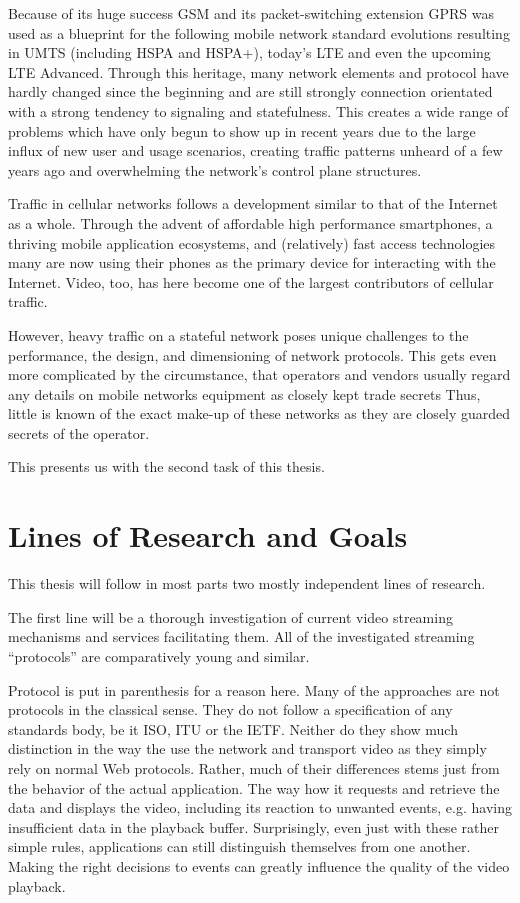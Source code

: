 Because of its huge success \gls{GSM} and its packet-switching extension \gls{GPRS} was used as a blueprint for the following mobile network standard evolutions resulting in \gls{UMTS} (including \gls{HSPA} and \gls{HSPA+}), today's \gls{LTE} and even the upcoming \gls{LTE} Advanced. Through this heritage, many network elements and protocol have hardly changed since the beginning and are still strongly connection orientated with a strong tendency to signaling and statefulness.
This creates a wide range of problems which have only begun to show up in recent years due to the large influx of new user and usage scenarios, creating traffic patterns unheard of a few years ago and overwhelming the network's control plane structures. 

Traffic in cellular networks follows a development similar to that of the Internet as a whole. Through the advent of affordable high performance smartphones, a thriving mobile application ecosystems, and (relatively) fast access technologies many are now using their phones as the primary device for interacting with the Internet. Video, too, has here become one of the largest contributors of cellular traffic. 

However, heavy traffic on a stateful network poses unique challenges to the performance, the design, and dimensioning of network protocols. This gets even more complicated by the circumstance, that operators and vendors usually regard any details on mobile networks equipment as closely kept trade secrets Thus, little is known of the exact make-up of these networks as they are closely guarded secrets of the operator.

This presents us with the second task of this thesis.



\section{Lines of Research and Goals}

This thesis will follow in most parts two mostly independent lines of research.

The first line will be a thorough investigation of current video streaming mechanisms and services facilitating them. All of the investigated streaming ``protocols'' are comparatively young and similar. 

Protocol is put in parenthesis for a reason here. Many of the approaches are not protocols in the classical sense. They do not follow a specification of any standards body, be it \gls{ISO}, \gls{ITU} or the \gls{IETF}. Neither do they show much distinction in the way the use the network and transport video as they simply rely on normal Web protocols. Rather, much of their differences stems just from the behavior of the actual application. The way how it requests and retrieve the data and displays the video, including its reaction to unwanted events, e.g. having insufficient data in the playback buffer. 
Surprisingly, even just with these rather simple rules, applications can still distinguish themselves from one another. Making the right decisions to events can greatly influence the quality of the video playback. 

